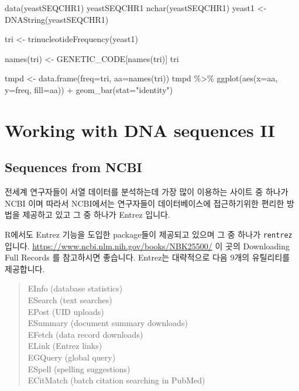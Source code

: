 \documentclass[
]{book}
\newenvironment{Shaded}{\begin{snugshade}}{\end{snugshade}}
\newcommand{\AttributeTok}[1]{\textcolor[rgb]{0.77,0.63,0.00}{#1}}
\newcommand{\FunctionTok}[1]{\textcolor[rgb]{0.00,0.00,0.00}{#1}}
\newcommand{\NormalTok}[1]{#1}
\newcommand{\OtherTok}[1]{\textcolor[rgb]{0.56,0.35,0.01}{#1}}
\newcommand{\SpecialCharTok}[1]{\textcolor[rgb]{0.00,0.00,0.00}{#1}}
\newcommand{\StringTok}[1]{\textcolor[rgb]{0.31,0.60,0.02}{#1}}
\begin{document}
\begin{Shaded}
\begin{Highlighting}[]
\FunctionTok{data}\NormalTok{(yeastSEQCHR1)}
\NormalTok{yeastSEQCHR1}
\FunctionTok{nchar}\NormalTok{(yeastSEQCHR1)}
\NormalTok{yeast1 }\OtherTok{\textless{}{-}} \FunctionTok{DNAString}\NormalTok{(yeastSEQCHR1)}


\NormalTok{tri }\OtherTok{\textless{}{-}} \FunctionTok{trinucleotideFrequency}\NormalTok{(yeast1)}

\FunctionTok{names}\NormalTok{(tri) }\OtherTok{\textless{}{-}}\NormalTok{ GENETIC\_CODE[}\FunctionTok{names}\NormalTok{(tri)]}
\NormalTok{tri}

\NormalTok{tmpd }\OtherTok{\textless{}{-}} \FunctionTok{data.frame}\NormalTok{(}\AttributeTok{freq=}\NormalTok{tri, }\AttributeTok{aa=}\FunctionTok{names}\NormalTok{(tri))}
\NormalTok{tmpd }\SpecialCharTok{\%\textgreater{}\%} 
  \FunctionTok{ggplot}\NormalTok{(}\FunctionTok{aes}\NormalTok{(}\AttributeTok{x=}\NormalTok{aa, }\AttributeTok{y=}\NormalTok{freq, }\AttributeTok{fill=}\NormalTok{aa)) }\SpecialCharTok{+}
  \FunctionTok{geom\_bar}\NormalTok{(}\AttributeTok{stat=}\StringTok{"identity"}\NormalTok{)}
\end{Highlighting}
\end{Shaded}

\hypertarget{working-with-dna-sequences-ii}{%
\chapter{Working with DNA sequences II}\label{working-with-dna-sequences-ii}}

\hypertarget{sequences-from-ncbi-1}{%
\section{Sequences from NCBI}\label{sequences-from-ncbi-1}}

전세계 연구자들이 서열 데이터를 분석하는데 가장 많이 이용하는 사이트 중 하나가 NCBI 이며 따라서 NCBI에서는 연구자들이 데이터베이스에 접근하기위한 편리한 방법을 제공하고 있고 그 중 하나가 Entrez 입니다.

R에서도 Entrez 기능을 도입한 package들이 제공되고 있으며 그 중 하나가 \texttt{rentrez} 입니다. \url{https://www.ncbi.nlm.nih.gov/books/NBK25500/} 이 곳의 Downloading Full Records 를 참고하시면 좋습니다. Entrez는 대략적으로 다음 9개의 유틸리티를 제공합니다.

\begin{quote}
EInfo (database statistics)\\
ESearch (text searches)\\
EPost (UID uploads)\\
ESummary (document summary downloads)\\
EFetch (data record downloads)\\
ELink (Entrez links)\\
EGQuery (global query)\\
ESpell (spelling suggestions)\\
ECitMatch (batch citation searching in PubMed)
\end{quote}
\end{document}
